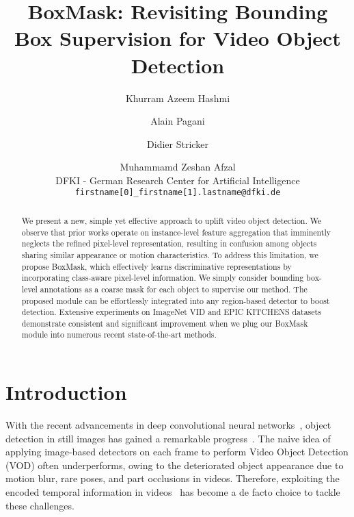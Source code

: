 \documentclass[10pt,twocolumn,letterpaper]{article}
\begin{document}
\title{BoxMask: Revisiting Bounding Box Supervision for Video Object Detection}

\author{
Khurram Azeem Hashmi
\and
Alain Pagani
\and
Didier Stricker
\and
Muhammamd Zeshan Afzal
\\
DFKI - German Research Center for Artificial Intelligence \\
{\tt\small firstname[0]\_firstname[1].lastname@dfki.de}
}



\maketitle
\thispagestyle{empty}

\begin{abstract}
    We present a new, simple yet effective approach to uplift video object detection. We observe that prior works operate on instance-level feature aggregation that imminently neglects the refined pixel-level representation, resulting in confusion among objects sharing similar appearance or motion characteristics. To address this limitation, we propose BoxMask, which effectively learns discriminative representations by incorporating class-aware pixel-level information. We simply consider bounding box-level annotations as a coarse mask for each object to supervise our method. The proposed module can be effortlessly integrated into any region-based detector to boost detection. Extensive experiments on ImageNet VID and EPIC KITCHENS datasets demonstrate consistent and significant improvement when we plug our BoxMask module into numerous recent state-of-the-art methods. 
\end{abstract}

\section{Introduction}
\label{sec:intorduction}
With the recent advancements in deep convolutional neural networks~\cite{he2016deep, xie2017aggregated, wang2020deep}, object detection in still images has gained a remarkable progress~\cite{girshick2014rich,ren2015faster,redmon2016you,sun2021sparse, ge2021yolox}. The naive idea of applying image-based detectors on each frame to perform Video Object Detection (VOD) often underperforms, owing to the deteriorated object appearance due to motion blur, rare poses, and part occlusions in videos. Therefore, exploiting the encoded temporal information in videos~\cite{zhu2017flow, zhu2017deep, wu2019sequence, gong2021temporal} has become a de facto choice to tackle these challenges. 
\end{document}
